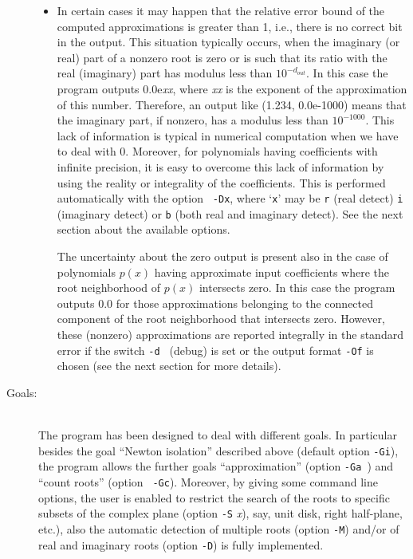 \documentclass{article}
\begin{document}
\begin{description}
\begin{itemize}
   
 \item In certain cases it may happen that the relative error bound of
   the computed approximations is greater than 1, i.e., there is no
   correct bit in the output. This situation typically occurs, when
   the imaginary (or real) part of a nonzero root is zero or is such
   that its ratio with the real (imaginary) part has modulus less than
   $10^{-d_{out}}$. In this case the program outputs 0.0e{\em xx},
   where {\em xx} is the exponent of the approximation of this number.
   Therefore, an output like (1.234, 0.0e-1000) means that the
   imaginary part, if nonzero, has a modulus less than $10^{-1000}$.
   This lack of information is typical in numerical computation when
   we have to deal with 0. Moreover, for polynomials having
   coefficients with infinite precision, it is easy to overcome this
   lack of information by using the reality or integrality of the
   coefficients. This is performed automatically with the option {\tt
     -Dx}, where `{\tt x}' may be {\tt r} (real detect) {\tt i}
   (imaginary detect) or {\tt b} (both real and imaginary detect). See
   the next section about the available options.

   The uncertainty about the zero output is present also in the case
   of polynomials $p(x)$ having approximate input coefficients where
   the root neighborhood of $p(x)$ intersects
   zero. In this case the program outputs 0.0 for those approximations
   belonging to the connected component of the root neighborhood that
   intersects zero. However, these (nonzero) approximations are
   reported integrally in the standard error if the switch {\tt -d }
   (debug) is set or the output format {\tt -Of} is chosen 
   (see the next section for more details).
  \end{itemize}

\item[Goals:] \ \\
  The program has been designed to deal with different goals.  In
  particular besides the goal ``Newton isolation'' described above
  (default option {\tt -Gi}), the program allows the further goals
  ``approximation'' (option {\tt -Ga }) and ``count roots'' (option {\tt
  -Gc}).  Moreover, by giving some command line options, 
   the user is enabled to restrict the search of the
  roots to specific subsets of the complex plane (option {\tt -S}{\em
  x}), say, unit disk, right half-plane, etc.), also the automatic
  detection of multiple roots (option {\tt -M}) and/or of real and
  imaginary roots (option {\tt -D}) is fully implemented.

\end{description}
\end{document}
